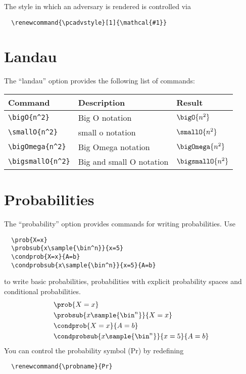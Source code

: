\documentclass[a4paper]{report}
\begin{document}
  The style in which an adversary is rendered is controlled via 
  \begin{lstlisting}
  \renewcommand{\pcadvstyle}[1]{\mathcal{#1}}
  \end{lstlisting}
  
  
  \section{Landau}
  The \enquote{landau} option provides the following list of commands:
  
  \begin{center}
  \begin{tabular}{l l l}
  \textbf{Command} & \textbf{Description} & \textbf{Result} \\\hline
  \lstinline$\bigO{n^2}$ & Big O notation & $\bigO{n^2}$  \\
  \lstinline$\smallO{n^2}$ & small o notation & $\smallO{n^2}$  \\
  \lstinline$\bigOmega{n^2}$ & Big Omega notation & $\bigOmega{n^2}$  \\
  \lstinline$\bigsmallO{n^2}$ & Big and small O notation & $\bigsmallO{n^2}$  
  \end{tabular}
  \end{center}
  
  
  \section{Probabilities}
  The \enquote{probability} option provides commands for writing probabilities. Use
  \begin{lstlisting}
  \prob{X=x}
  \probsub{x\sample{\bin^n}}{x=5}
  \condprob{X=x}{A=b}
  \condprobsub{x\sample{\bin^n}}{x=5}{A=b}
  \end{lstlisting}
  to write basic probabilities, probabilities with explicit probability spaces and conditional probabilities.
  \begin{align*}
  & \prob{X=x} \\
  & \probsub{x\sample{\bin^n}}{X=x} \\
  & \condprob{X=x}{A=b} \\
  & \condprobsub{x\sample{\bin^n}}{x=5}{A=b}
  \end{align*}
  You can control the probability symbol (Pr) by redefining
  \begin{lstlisting}
  \renewcommand{\probname}{Pr}
  \end{lstlisting}
  
\end{document}
